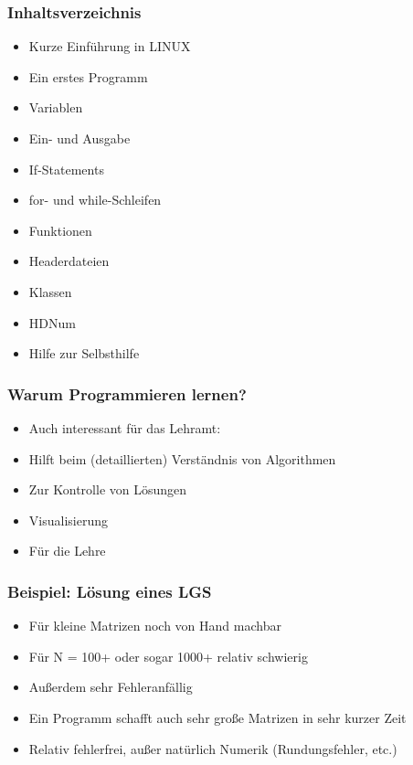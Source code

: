 
\begin{frame}[fragile]
\frametitle{Inhaltsverzeichnis}
\begin{itemize}
\footnotesize
\item Kurze Einführung in LINUX
\item Ein erstes Programm
\item Variablen
\item Ein- und Ausgabe
\item If-Statements
\item for- und while-Schleifen
\item Funktionen
\item Headerdateien
\item Klassen
\item HDNum
\item Hilfe zur Selbsthilfe
\end{itemize}
\end{frame}


\begin{frame}[fragile]
\frametitle{Warum Programmieren lernen?}
\begin{itemize}
\item Auch interessant für das Lehramt:
\item Hilft beim (detaillierten) Verständnis von Algorithmen
\item Zur Kontrolle von Lösungen
\item Visualisierung
\item Für die Lehre
\end{itemize}
\end{frame}

\begin{frame}[fragile]
\frametitle{Beispiel: Lösung eines LGS}
\begin{itemize}
\item Für kleine Matrizen noch von Hand machbar
\item Für N = 100+ oder sogar 1000+ relativ schwierig
\item Au\ss erdem sehr Fehleranfällig
\item Ein Programm schafft auch sehr gro\ss e Matrizen in sehr kurzer Zeit
\item Relativ fehlerfrei, au\ss er natürlich Numerik (Rundungsfehler, etc.)
\end{itemize}
\end{frame}


